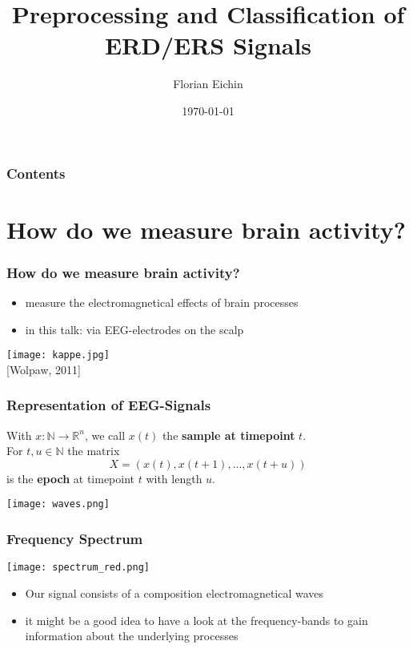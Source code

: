 \documentclass{beamer}
\title{Preprocessing and Classification of ERD/ERS Signals}
\author{Florian Eichin}
\institute{Freiburg University}
\date{\today}
\begin{document}
\maketitle

\begin{frame}
	\frametitle{Contents}
	\tableofcontents
\end{frame}

\section{How do we measure brain activity?}

\begin{frame}
\frametitle{How do we measure brain activity?}
	\begin{itemize}
	\item measure the electromagnetical effects of brain processes
	\item in this talk: via EEG-electrodes on the scalp
	\end{itemize}
	\centering
	\texttt{[image: kappe.jpg]} \\
	{\tiny [Wolpaw, 2011]}
\end{frame}


\begin{frame}
	\frametitle{Representation of EEG-Signals}
	\begin{definition}
	With $x: \mathds{N} \rightarrow \mathds{R}^n$, we call $x(t)$ the {\bf sample at timepoint} $t$. \\
	For $t, u \in \mathds{N}$ the matrix
	\begin{equation}
		X = (x(t), x(t+1), ..., x(t+u))
	\end{equation} 
	is the {\bf epoch} at timepoint $t$ with length $u$.
	\end{definition}
	\centering
	\texttt{[image: waves.png]}
\end{frame}

\begin{frame}
\frametitle{Frequency Spectrum}
\centering
\texttt{[image: spectrum\_red.png]}
	\begin{itemize}
	\item Our signal consists of a composition electromagnetical waves
	\item it might be a good idea to have a look at the frequency-bands to gain information about the underlying processes
	\end{itemize}
\end{frame}
\end{document}
